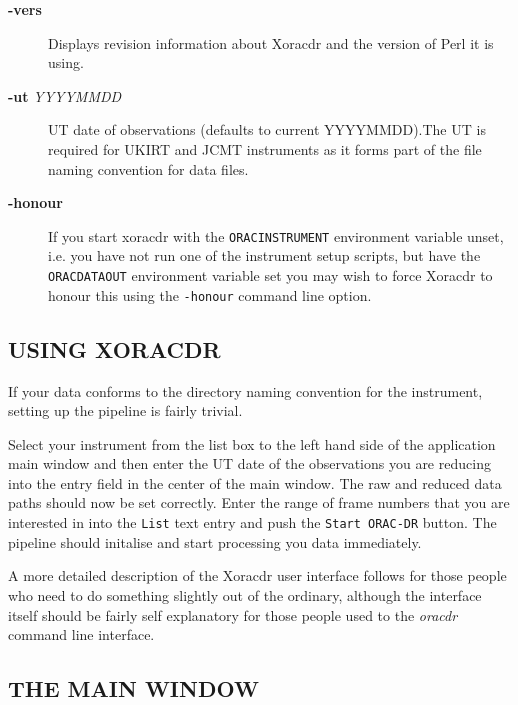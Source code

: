 \documentclass[twoside,11pt]{article}
\renewcommand{\_}{\texttt{\symbol{95}}}
\begin{document}
\begin{description}

\item[{\textbf{-vers}}] \mbox{}

Displays revision information about Xoracdr and the version of Perl it
is using.


\item[{\textbf{-ut} \textit{YYYYMMDD}}] \mbox{}

UT date of observations (defaults to current YYYYMMDD).The UT is
required for UKIRT and JCMT instruments as it forms part of the file
naming convention for data files.


\item[{\textbf{-honour}}] \mbox{}

If you start xoracdr with the \texttt{ORAC\_INSTRUMENT} environment variable
unset, i.e. you have not run one of the instrument setup scripts, but
have the \texttt{ORAC\_DATA\_OUT} environment variable set you may wish to
force Xoracdr to honour this using the \texttt{-honour} command line option.

\end{description}
\subsection*{USING XORACDR\label{Xoracdr_USING_XORACDR}}


If your data conforms to the directory naming convention for the
instrument, setting up the pipeline is fairly trivial.



Select your instrument from the list box to the left hand side of the
application main window and then enter the UT date of the observations
you are reducing into the entry field in the center of the main
window. The raw and reduced data paths should now be set
correctly. Enter the range of frame numbers that you are interested in
into the \texttt{List} text entry and push the \texttt{Start ORAC-DR} button. The
pipeline should initalise and start processing you data immediately.



A more detailed description of the Xoracdr user interface follows for
those people who need to do something slightly out of the ordinary,
although the interface itself should be fairly self explanatory for
those people used to the \emph{oracdr} command line interface.

\subsection*{THE MAIN WINDOW\label{Xoracdr_THE_MAIN_WINDOW}}
\end{document}
